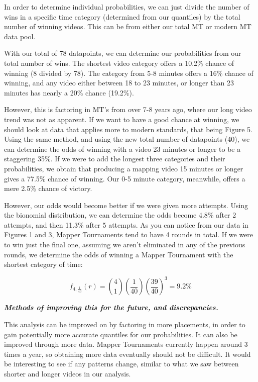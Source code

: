 \documentclass[letterpaper,twocolumn,amsmath,amssymb,prl,nolongbibliography,url,reprint]{revtex4-2}
\begin{document}
In order to determine individual probabilities, we can just divide the number of wins in a specific time category (determined from our quantiles) by the total number of winning videos. This can be from either our total MT or modern MT data pool. 

With our total of 78 datapoints, we can determine our probabilities from our total number of wins. The shortest video category offers a 10.2\% chance of winning (8 divided by 78). The category from 5-8 minutes offers a 16\% chance of winning, and any video either between 18 to 23 minutes, or longer than 23 minutes has nearly a 20\% chance (19.2\%).

However, this is factoring in MT's from over 7-8 years ago, where our long video trend was not as apparent. If we want to have a good chance at winning, we should look at data that applies more to modern standards, that being Figure 5. Using the same method, and using the new total number of datapoints (40), we can determine the odds of winning with a video 23 minutes or longer to be a staggering 35\%. If we were to add the longest three categories and their probabilities, we obtain that producing a mapping video 15 minutes or longer gives a 77.5\% chance of winning. Our 0-5 minute category, meanwhile, offers a mere 2.5\% chance of victory.

However, our odds would become better if we were given more attempts. Using the bionomial distribution, we can determine the odds become 4.8\% after 2 attempts, and then 11.3\% after 5 attempts. As you can notice from our data in Figures 1 and 3, Mapper Tournaments tend to have 4 rounds in total. If we were to win just the final one, assuming we aren't eliminated in any of the previous rounds, we determine the odds of winning a Mapper Tournament with the shortest category of time:

\begin{equation}
f_{4,\frac{1}{40}}(r) = \binom{4}{1} (\frac{1}{40}) (\frac{39}{40})^3 = 9.2\%
\end{equation}

\textbf{\emph{Methods of improving this for the future, and discrepancies.}}

This analysis can be improved on by factoring in more placements, in order to gain potentially more accurate quantiles for our probabilities. It can also be improved through more data. Mapper Tournaments currently happen around 3 times a year, so obtaining more data eventually should not be difficult. It would be interesting to see if any patterns change, similar to what we saw between shorter and longer videos in our analysis. 
\end{document}
